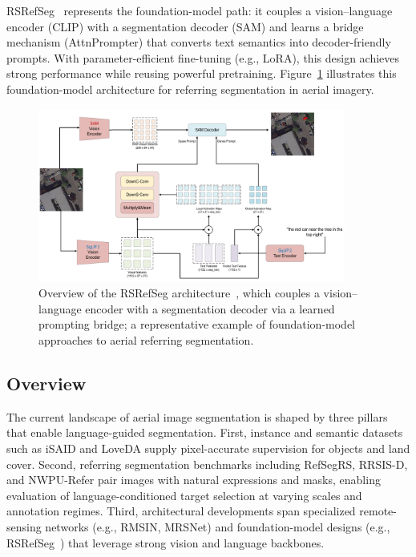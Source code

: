 RSRefSeg~\cite{chen2025rsrefseg} represents the foundation-model path: it couples a vision–language encoder (CLIP) with a segmentation decoder (SAM) and learns a bridge mechanism (AttnPrompter) that converts text semantics into decoder-friendly prompts. With parameter-efficient fine-tuning (e.g., LoRA), this design achieves strong performance while reusing powerful pretraining. Figure~\ref{fig:rsrefseg_arch} illustrates this foundation-model architecture for referring segmentation in aerial imagery.
\begin{figure}[t]
\centering
\includegraphics[width=0.9\textwidth]{./images/rsrefseg.png}
\caption{Overview of the RSRefSeg architecture~\cite{chen2025rsrefseg}, which couples a vision–language encoder with a segmentation decoder via a learned prompting bridge; a representative example of foundation-model approaches to aerial referring segmentation.}
\label{fig:rsrefseg_arch}
\end{figure}

\subsection{Overview}

The current landscape of aerial image segmentation is shaped by three pillars that enable language-guided segmentation. First, instance and semantic datasets such as iSAID and LoveDA supply pixel-accurate supervision for objects and land cover. Second, referring segmentation benchmarks including RefSegRS, RRSIS-D, and NWPU-Refer pair images with natural expressions and masks, enabling evaluation of language-conditioned target selection at varying scales and annotation regimes. Third, architectural developments span specialized remote-sensing networks (e.g., RMSIN, MRSNet) and foundation-model designs (e.g., RSRefSeg~\cite{chen2025rsrefseg}) that leverage strong vision and language backbones.

